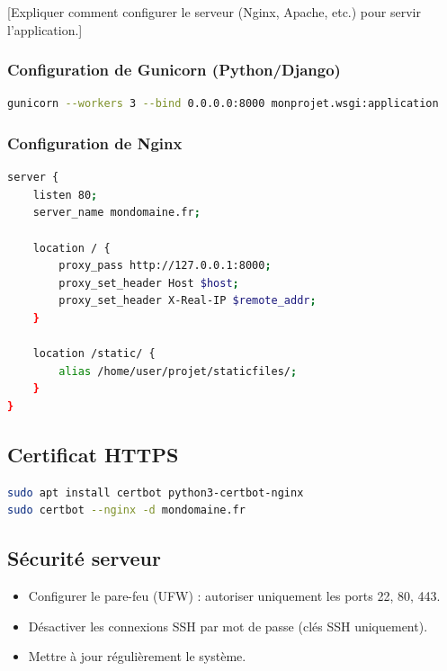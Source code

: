 \documentclass[12pt, a4paper]{article}
\begin{document}
[Expliquer comment configurer le serveur (Nginx, Apache, etc.) pour servir
l'application.]

\subsubsection{Configuration de Gunicorn (Python/Django)}

\begin{lstlisting}[language=bash, caption=Lancement avec Gunicorn]
gunicorn --workers 3 --bind 0.0.0.0:8000 monprojet.wsgi:application
\end{lstlisting}

\subsubsection{Configuration de Nginx}

\begin{lstlisting}[language=bash, caption=Configuration Nginx (/etc/nginx/sites-available/monprojet)]
server {
    listen 80;
    server_name mondomaine.fr;

    location / {
        proxy_pass http://127.0.0.1:8000;
        proxy_set_header Host $host;
        proxy_set_header X-Real-IP $remote_addr;
    }

    location /static/ {
        alias /home/user/projet/staticfiles/;
    }
}
\end{lstlisting}

\subsection{Certificat HTTPS}

\begin{lstlisting}[language=bash, caption=Installation de Certbot (Let's Encrypt)]
sudo apt install certbot python3-certbot-nginx
sudo certbot --nginx -d mondomaine.fr
\end{lstlisting}

\subsection{Sécurité serveur}

\begin{itemize}
  \item Configurer le pare-feu (UFW) : autoriser uniquement les ports 22, 80, 443.
  \item Désactiver les connexions SSH par mot de passe (clés SSH uniquement).
  \item Mettre à jour régulièrement le système.
\end{itemize}
\end{document}
